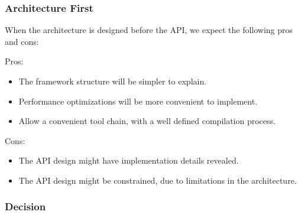 \subsubsection{Architecture First}
When the architecture is designed before the API, we expect the following pros and cons:

Pros:
\begin{itemize}
\item The framework structure will be simpler to explain.
\item Performance optimizations will be more convenient to implement.
\item Allow a convenient tool chain, with a well defined compilation process.
\end{itemize}

Cons:
\begin{itemize}
\item The API design might have implementation details revealed.
\item The API design might be constrained, due to limitations in the architecture.
\end{itemize}

%
%

\subsubsection{Decision}
